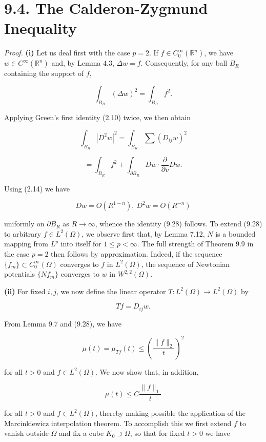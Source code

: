 \section*{9.4. The Calderon-Zygmund Inequality}

\textit{Proof.} \textbf{(i)} Let us deal first with the case $p = 2$. If $f \in C^\infty_0(\mathbb{R}^n)$, we have $w \in C^\infty(\mathbb{R}^n)$ and, by Lemma 4.3, $\Delta w = f$. Consequently, for any ball $B_R$ containing the support of $f$,

\[
\int_{B_R} (\Delta w)^2 = \int_{B_R} f^2.
\]

Applying Green's first identity (2.10) twice, we then obtain

\[
\int_{B_R} |D^2 w|^2 = \int_{B_R} \sum (D_{ij} w)^2
\]

\[
= \int_{B_R} f^2 + \int_{\partial B_R} Dw \cdot \frac{\partial}{\partial v} Dw.
\]

Using (2.14) we have

\[
Dw = O(R^{1-n}),\ D^2 w = O(R^{-n})
\]

uniformly on $\partial B_R$ as $R \to \infty$, whence the identity (9.28) follows. To extend (9.28) to arbitrary $f \in L^2(\Omega)$, we observe first that, by Lemma 7.12, $N$ is a bounded mapping from $L^p$ into itself for $1 \leq p < \infty$. The full strength of Theorem 9.9 in the case $p = 2$ then follows by approximation. Indeed, if the sequence $\{f_m\} \subset C^\infty_0(\Omega)$ converges to $f$ in $L^2(\Omega)$, the sequence of Newtonian potentials $\{Nf_m\}$ converges to $w$ in $W^{2,2}(\Omega)$.

\textbf{(ii)} For fixed $i, j$, we now define the linear operator $T: L^2(\Omega) \to L^2(\Omega)$ by

\[
Tf = D_{ij} w.
\]

From Lemma 9.7 and (9.28), we have

\begin{equation}
\mu(t) = \mu_{Tf}(t) \leq \left(\frac{\|f\|_2}{t}\right)^2
\tag{9.29}
\end{equation}

for all $t > 0$ and $f \in L^2(\Omega)$. We now show that, in addition,

\begin{equation}
\mu(t) \leq C \frac{\|f\|_1}{t}
\tag{9.30}
\end{equation}




for all $t>0$ and $f\in L^2(\Omega)$, thereby making possible the application of the Marcinkiewicz interpolation theorem. To accomplish this we first extend $f$ to vanish outside $\Omega$ and fix a cube $K_0 \supset \Omega$, so that for fixed $t>0$ we have

